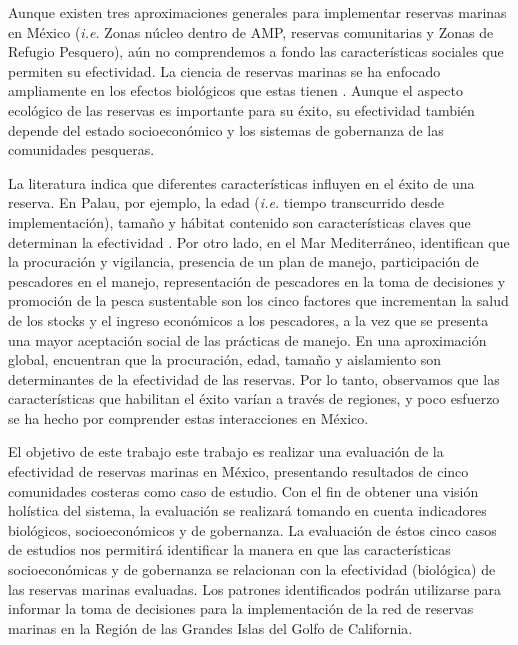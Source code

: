 \documentclass{frontiersSCNS}
\begin{document}
Aunque existen tres aproximaciones generales para implementar reservas
marinas en México (\emph{i.e.} Zonas núcleo dentro de AMP, reservas
comunitarias y Zonas de Refugio Pesquero), aún no comprendemos a fondo
las características sociales que permiten su efectividad. La ciencia de
reservas marinas se ha enfocado ampliamente en los efectos biológicos
que estas tienen
\citep{lester_2009-Ks,giakoumi_2017-V2,sala_2017-69,afflerbach_2014-HP,krueck_2017-J1}.
Aunque el aspecto ecológico de las reservas es importante para su éxito,
su efectividad también depende del estado socioeconómico y los sistemas
de gobernanza de las comunidades pesqueras.

La literatura indica que diferentes características influyen en el éxito
de una reserva. En Palau, por ejemplo, la edad (\emph{i.e.} tiempo
transcurrido desde implementación), tamaño y hábitat contenido son
características claves que determinan la efectividad
\citep{friedlander_2017-oI}. Por otro lado, en el Mar Mediterráneo,
\citet{difranco_2016-Xw} identifican que la procuración y vigilancia,
presencia de un plan de manejo, participación de pescadores en el
manejo, representación de pescadores en la toma de decisiones y
promoción de la pesca sustentable son los cinco factores que incrementan
la salud de los stocks y el ingreso económicos a los pescadores, a la
vez que se presenta una mayor aceptación social de las prácticas de
manejo. En una aproximación global, \citet{edgar_2014-UO} encuentran que
la procuración, edad, tamaño y aislamiento son determinantes de la
efectividad de las reservas. Por lo tanto, observamos que las
características que habilitan el éxito varían a través de regiones, y
poco esfuerzo se ha hecho por comprender estas interacciones en México.

El objetivo de este trabajo este trabajo es realizar una evaluación de
la efectividad de reservas marinas en México, presentando resultados de
cinco comunidades costeras como caso de estudio. Con el fin de obtener
una visión holística del sistema, la evaluación se realizará tomando en
cuenta indicadores biológicos, socioeconómicos y de gobernanza. La
evaluación de éstos cinco casos de estudios nos permitirá identificar la
manera en que las características socioeconómicas y de gobernanza se
relacionan con la efectividad (biológica) de las reservas marinas
evaluadas. Los patrones identificados podrán utilizarse para informar la
toma de decisiones para la implementación de la red de reservas marinas
en la Región de las Grandes Islas del Golfo de California.
\end{document}
